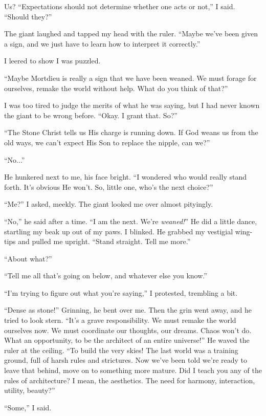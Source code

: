 Us? ``Expectations should not determine whether one acts or not,'' I said. ``Should they?''

The giant laughed and tapped my head with the ruler. ``Maybe we've been given a sign, and we just have to learn how to interpret it correctly.''

I leered to show I was puzzled.

``Maybe Mortdieu is really a sign that we have been weaned. We must forage for ourselves, remake the world without help. What do you think of that?''

I was too tired to judge the merits of what he was saying, but I had never known the giant to be wrong before. ``Okay. I grant that. So?''

``The Stone Christ tells us His charge is running down. If God weans us from the old ways, we can't expect His Son to replace the nipple, can we?''

``No...''

He hunkered next to me, his face bright. ``I wondered who would really stand forth. It's obvious He won't. So, little one, who's the next choice?''

``Me?'' I asked, meekly. The giant looked me over almost pityingly.

``No,'' he said after a time. ``I am the next. We're \textit{weaned!}'' He did a little dance, startling my beak up out of my paws. I blinked. He grabbed my vestigial wing-tips and pulled me upright. ``Stand straight. Tell me more.''

``About what?''

``Tell me all that's going on below, and whatever else you know.''

``I'm trying to figure out what you're saying,'' I protested, trembling a bit.

``Dense as stone!'' Grinning, he bent over me. Then the grin went away, and he tried to look stern. ``It's a grave responsibility. We must remake the world ourselves now. We must coordinate our thoughts, our dreams. Chaos won't do. What an opportunity, to be the architect of an entire universe!'' He waved the ruler at the ceiling. ``To build the very skies! The last world was a training ground, full of harsh rules and strictures. Now we've been told we're ready to leave that behind, move on to something more mature. Did I teach you any of the rules of architecture? I mean, the aesthetics. The need for harmony, interaction, utility, beauty?''

``Some,'' I said.


